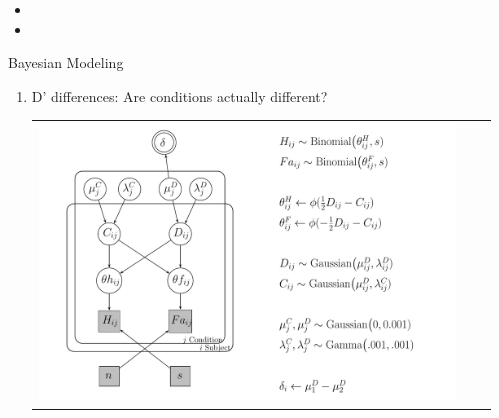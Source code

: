 \documentclass[final]{beamer}
\newlength{\sepwid}
\newlength{\onecolwid}
\newlength{\twocolwid}
\begin{document}
\begin{frame}[t]
\begin{columns}[t]
\begin{column}{\twocolwid}
\begin{columns}[t,totalwidth=\twocolwid]
\begin{column}{\sepwid}\end{column} %
\begin{column}{\onecolwid}\vspace{-2.1in} %


\begin{itemize}
\item
\item
\end{itemize}


\begin{alertblock}{Bayesian Modeling}


\begin{enumerate}
\item D' differences: Are conditions actually different?
\begin{center}
\begin{tabular}{ccc}
\includegraphics[width=0.8\linewidth]{Figures/Delta_DiffD_Model4.pdf}
\end{tabular}
\end{center}


\end{enumerate}
\end{alertblock}
\end{column}
\end{columns}
\end{column}
\end{columns}
\end{frame}
\end{document}
